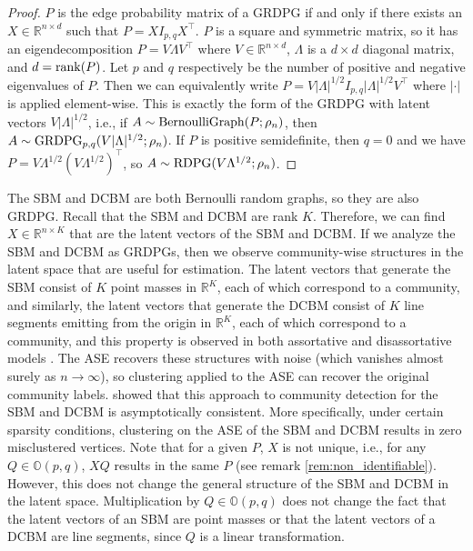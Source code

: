 \documentclass[
  12pt,
]{article}
\theoremstyle{definition}
\theoremstyle{definition}
\theoremstyle{definition}
\theoremstyle{definition}
\theoremstyle{remark}
\begin{document}
\begin{proof}
$P$ is the edge probability matrix of a GRDPG if and only if there exists an $X \in \mathbb{R}^{n \times d}$ such that $P = X I_{p,q} X^\top$. 
$P$ is a square and symmetric matrix, so it has an eigendecomposition $P = V \Lambda V^\top$ where $V \in \mathbb{R}^{n \times d}$, $\Lambda$ is a $d \times d$ diagonal matrix, and $d = \mathrm{rank}(P)$. 
Let $p$ and $q$ respectively be the number of positive and negative eigenvalues of $P$. 
Then we can equivalently write $P = V |\Lambda|^{1/2} I_{p,q} |\Lambda|^{1/2} V^\top$ where $|\cdot|$ is applied element-wise. 
This is exactly the form of the GRDPG with latent vectors $V |\Lambda|^{1/2}$,
i.e., if $A \sim \mathrm{BernoulliGraph}(P; \rho_n)$, then $A \sim \mathrm{GRDPG}_{p,q}(V |\Lambda|^{1/2}; \rho_n)$. 
If $P$ is positive semidefinite, then $q = 0$ and we have $P = V \Lambda^{1/2} (V \Lambda^{1/2})^\top$, so $A \sim \mathrm{RDPG}(V \Lambda^{1/2}; \rho_n)$. 
\end{proof}

The SBM and DCBM are both Bernoulli random graphs, so they are also GRDPG.
Recall that the SBM and DCBM are rank \(K\).
Therefore, we can find \(X \in \mathbb{R}^{n \times K}\) that are the latent vectors of the SBM and DCBM.
If we analyze the SBM and DCBM as GRDPGs, then we observe community-wise structures in the latent space that are useful for estimation.
The latent vectors that generate the SBM consist of \(K\) point masses in \(\mathbb{R}^K\), each of which correspond to a community, and similarly, the latent vectors that generate the DCBM consist of \(K\) line segments emitting from the origin in \(\mathbb{R}^K\), each of which correspond to a community, and this property is observed in both assortative and disassortative models \citep{rubindelanchy2017statistical}.
The ASE recovers these structures with noise (which vanishes almost surely as \(n \to \infty\)), so clustering applied to the ASE can recover the original community labels.
\citet{rubindelanchy2017statistical} showed that this approach to community detection for the SBM and DCBM is asymptotically consistent.
More specifically, under certain sparsity conditions, clustering on the ASE of the SBM and DCBM results in zero misclustered vertices.
Note that for a given \(P\), \(X\) is not unique, i.e., for any \(Q \in \mathbb{O}(p, q)\), \(X Q\) results in the same \(P\) (see remark \ref{rem:non_identifiable}).
However, this does not change the general structure of the SBM and DCBM in the latent space.
Multiplication by \(Q \in \mathbb{O}(p,q)\) does not change the fact that the latent vectors of an SBM are point masses or that the latent vectors of a DCBM are line segments, since \(Q\) is a linear transformation.
\end{document}
